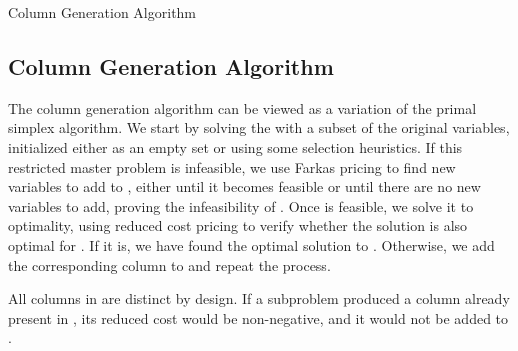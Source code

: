 \begin{algorithm}
\caption{Column Generation Algorithm}

\end{algorithm}

\subsection{Column Generation Algorithm}\label{sec:cg_bp_cg_alg}

The column generation algorithm can be viewed as a variation of the primal simplex algorithm. We start by solving the \MP{} with a subset of the original variables, initialized either as an empty set or using some selection heuristics. If this restricted master problem \RMP{} is infeasible, we use Farkas pricing to find new variables to add to \RMP{}, either until it becomes feasible or until there are no new variables to add, proving the infeasibility of \MP{}. Once \RMP{} is feasible, we solve it to optimality, using reduced cost pricing to verify whether the solution is also optimal for \MP{}. If it is, we have found the optimal solution to \MP{}. Otherwise, we add the corresponding column to \RMP{} and repeat the process.

\begin{note}\label{note:distinct_columns}
	All columns in \RMP{} are distinct by design. If a subproblem produced a column already present in \RMP{}, its reduced cost would be non-negative, and it would not be added to \RMP{}.
\end{note}
